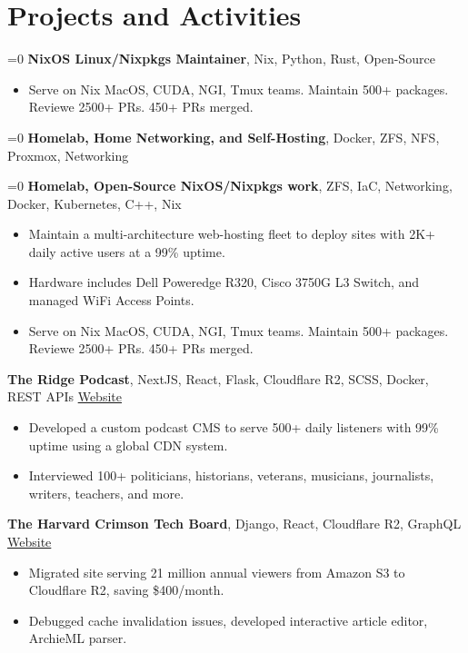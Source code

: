 \section{Projects and Activities}

\ifnum{}=0
\textbf{NixOS Linux/Nixpkgs Maintainer}, Nix, Python, Rust, Open-Source

\begin{itemize}[noitemsep]
    \item Serve on Nix MacOS, CUDA, NGI, Tmux teams. Maintain 500+ packages. Reviewe 2500+ PRs. 450+ PRs merged.
\end{itemize}
\fi

\ifnum{}=0
\textbf{Homelab, Home Networking, and Self-Hosting}, Docker, ZFS, NFS, Proxmox, Networking
\fi

\ifnum{}=0
\textbf{Homelab, Open-Source NixOS/Nixpkgs work}, ZFS, IaC, Networking, Docker, Kubernetes, C++, Nix
\fi

\begin{itemize}[noitemsep]
    \item Maintain a multi-architecture web-hosting fleet to deploy sites with 2K+ daily active users at a 99\% uptime.
    \item Hardware includes Dell Poweredge R320, Cisco 3750G L3 Switch, and managed WiFi Access Points.
    \item Serve on Nix MacOS, CUDA, NGI, Tmux teams. Maintain 500+ packages. Reviewe 2500+ PRs. 450+ PRs merged.
\end{itemize}

\textbf{The Ridge Podcast}, NextJS, React, Flask, Cloudflare R2, SCSS, Docker, REST APIs \hfill \href{https://theridgepodcast.com}{Website}

\begin{itemize}[noitemsep]
    \item Developed a custom podcast CMS to serve 500+ daily listeners with 99\% uptime using a global CDN system.
    \item Interviewed 100+ politicians, historians, veterans, musicians, journalists, writers, teachers, and more.
\end{itemize}

\textbf{The Harvard Crimson Tech Board}, Django, React, Cloudflare R2, GraphQL \hfill \href{https://thecrimson.com}{Website}

\begin{itemize}[noitemsep]
    \item Migrated site serving 21 million annual viewers from Amazon S3 to Cloudflare R2, saving \$400/month.
    \item Debugged cache invalidation issues, developed interactive article editor, ArchieML parser.
\end{itemize}

